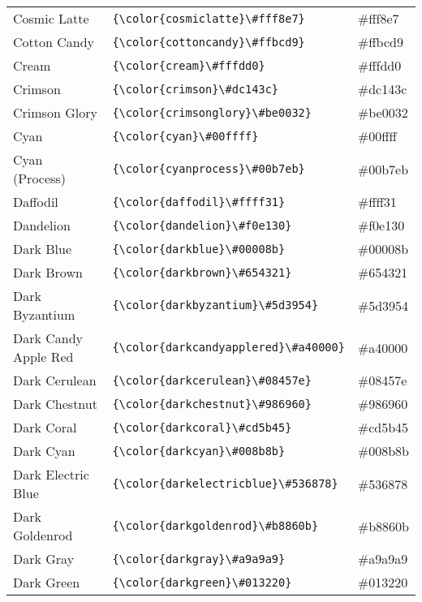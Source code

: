 \documentclass[9.5pt]{article}
\begin{document}
\begin{longtable}{l | l | l}
	Cosmic Latte & \verb!{\color{cosmiclatte}\#fff8e7}! & {\color{cosmiclatte}\#fff8e7}\\
	Cotton Candy & \verb!{\color{cottoncandy}\#ffbcd9}! & {\color{cottoncandy}\#ffbcd9}\\
	Cream & \verb!{\color{cream}\#fffdd0}! & {\color{cream}\#fffdd0}\\
	Crimson & \verb!{\color{crimson}\#dc143c}! & {\color{crimson}\#dc143c}\\
	Crimson Glory & \verb!{\color{crimsonglory}\#be0032}! & {\color{crimsonglory}\#be0032}\\
	Cyan & \verb!{\color{cyan}\#00ffff}! & {\color{cyan}\#00ffff}\\
	Cyan (Process) & \verb!{\color{cyanprocess}\#00b7eb}! & {\color{cyanprocess}\#00b7eb}\\
	Daffodil & \verb!{\color{daffodil}\#ffff31}! & {\color{daffodil}\#ffff31}\\
	Dandelion & \verb!{\color{dandelion}\#f0e130}! & {\color{dandelion}\#f0e130}\\
	Dark Blue & \verb!{\color{darkblue}\#00008b}! & {\color{darkblue}\#00008b}\\
	Dark Brown & \verb!{\color{darkbrown}\#654321}! & {\color{darkbrown}\#654321}\\
	Dark Byzantium & \verb!{\color{darkbyzantium}\#5d3954}! & {\color{darkbyzantium}\#5d3954}\\
	Dark Candy Apple Red & \verb!{\color{darkcandyapplered}\#a40000}! & {\color{darkcandyapplered}\#a40000}\\
	Dark Cerulean & \verb!{\color{darkcerulean}\#08457e}! & {\color{darkcerulean}\#08457e}\\
	Dark Chestnut & \verb!{\color{darkchestnut}\#986960}! & {\color{darkchestnut}\#986960}\\
	Dark Coral & \verb!{\color{darkcoral}\#cd5b45}! & {\color{darkcoral}\#cd5b45}\\
	Dark Cyan & \verb!{\color{darkcyan}\#008b8b}! & {\color{darkcyan}\#008b8b}\\
	Dark Electric Blue & \verb!{\color{darkelectricblue}\#536878}! & {\color{darkelectricblue}\#536878}\\
	Dark Goldenrod & \verb!{\color{darkgoldenrod}\#b8860b}! & {\color{darkgoldenrod}\#b8860b}\\
	Dark Gray & \verb!{\color{darkgray}\#a9a9a9}! & {\color{darkgray}\#a9a9a9}\\
	Dark Green & \verb!{\color{darkgreen}\#013220}! & {\color{darkgreen}\#013220}\\

\end{longtable}
\end{document}
